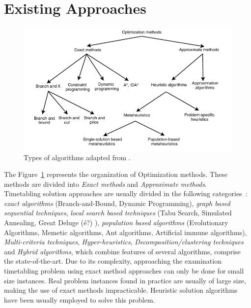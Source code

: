 \section{Existing Approaches}
\label{subsection:ExistingAppr}
\begin{figure}[h!]
 \centering
   \includegraphics{./images/typesOfAlgorithms}
   \caption{Types of algorithms adapted from \cite{Talbi2009}.}
   \label{fig:TypesAlgorithms}
\end{figure}

The Figure~\ref{fig:TypesAlgorithms} represents the organization of Optimization methods. These methods are divided into \textit{Exact methods} and \textit{Approximate methods}.\\

Timetabling solution approaches are usually divided in the following categories~\cite{Qu2009}: \textit{exact algorithms} (Branch-and-Bound, Dynamic Programming), \textit{graph based sequential techniques}, \textit{local search based techniques} (Tabu Search, Simulated Annealing, Great Deluge {\color{red} (é?)} ), \textit{population based algorithms} (Evolutionary Algorithms, Memetic algorithms, Ant algorithms, Artificial immune algorithms), \textit{Multi-criteria techniques}, \textit{Hyper-heuristics}, \textit{Decomposition/clustering techniques} and \textit{Hybrid algorithms}, which combine features of several algorithms, comprise the state-of-the-art. Due to its complexity, approaching the examination timetabling problem using exact method approaches can only be done for small size instances. Real problem instances found in practice are usually of large size, making the use of exact methods impracticable. Heuristic solution algorithms have been usually employed to solve this problem.\\

